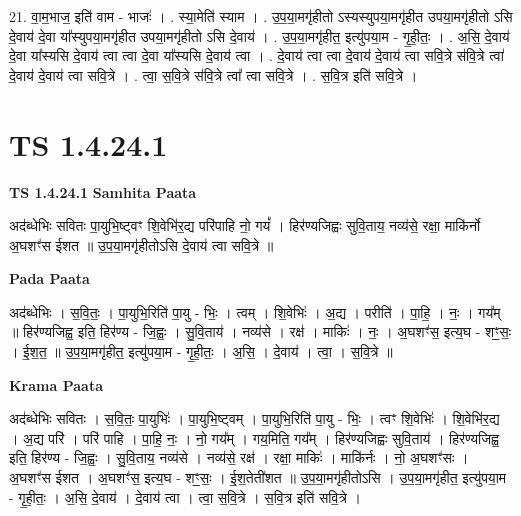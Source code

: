 \documentclass[17pt]{extarticle}
\begin{document}
21. वा॒म॒भाज॒ इति॑ वाम - भाजः॑ । . स्या॒मेति॑ स्याम । . उ॒प॒या॒मगृ॑हीतो ऽस्यस्युपया॒मगृ॑हीत उपया॒मगृ॑हीतो ऽसि दे॒वाय॑ दे॒वा या᳚स्युपया॒मगृ॑हीत उपया॒मगृ॑हीतो ऽसि दे॒वाय॑ । . उ॒प॒या॒मगृ॑हीत॒ इत्यु॑पया॒म - गृ॒ही॒तः॒ । . अ॒सि॒ दे॒वाय॑ दे॒वा या᳚स्यसि दे॒वाय॑ त्वा त्वा दे॒वा या᳚स्यसि दे॒वाय॑ त्वा । . दे॒वाय॑ त्वा त्वा दे॒वाय॑ दे॒वाय॑ त्वा सवि॒त्रे स॑वि॒त्रे त्वा॑ दे॒वाय॑ दे॒वाय॑ त्वा सवि॒त्रे । . त्वा॒ स॒वि॒त्रे स॑वि॒त्रे त्वा᳚ त्वा सवि॒त्रे । . स॒वि॒त्र इति॑ सवि॒त्रे । \newline
\pagebreak
{}

\section{ TS 1.4.24.1 }

\textbf{TS 1.4.24.1 } \newline
\textbf{Samhita Paata} \newline

अद॑ब्धेभिः सवितः पा॒युभि॒ष्ट्वꣳ शि॒वेभि॑र॒द्य परि॑पाहि नो॒ गयं᳚ । हिर॑ण्यजिह्वः सुवि॒ताय॒ नव्य॑से॒ रक्षा॒ माकि॑र्नो अ॒घशꣳ॑स ईशत ॥ उ॒प॒या॒मगृ॑हीतोऽसि दे॒वाय॑ त्वा सवि॒त्रे ॥ \newline

\textbf{Pada Paata} \newline

अद॑ब्धेभिः । स॒वि॒तः॒ । पा॒युभि॒रिति॑ पा॒यु - भिः॒ । त्वम् । शि॒वेभिः॑ । अ॒द्य । परीति॑ । पा॒हि॒ । नः॒ । गय᳚म् ॥ हिर॑ण्यजिह्व॒ इति॒ हिर॑ण्य - जि॒ह्वः॒ । सु॒वि॒ताय॑ । नव्य॑से । रक्ष॑ । माकिः॑ । नः॒ । अ॒घशꣳ॑स॒ इत्य॒घ - शꣳ॒॒सः॒ । ई॒श॒त॒ ॥ उ॒प॒या॒मगृ॑हीत॒ इत्यु॑पया॒म - गृ॒ही॒तः॒ । अ॒सि॒ । दे॒वाय॑ । त्वा॒ । स॒वि॒त्रे ॥  \newline


\textbf{Krama Paata} \newline

अद॑ब्धेभिः सवितः । स॒वि॒तः॒ पा॒युभिः॑ । पा॒युभि॒ष्ट्वम् । पा॒युभि॒रिति॑ पा॒यु - भिः॒ । त्वꣳ शि॒वेभिः॑ । शि॒वेभि॑र॒द्य । अ॒द्य परि॑ । परि॑ पाहि । पा॒हि॒ नः॒ । नो॒ गय᳚म् । गय॒मिति॒ गय᳚म् । हिर॑ण्यजिह्वः सुवि॒ताय॑ । हिर॑ण्यजिह्व॒ इति॒ हिर॑ण्य - जि॒ह्वः॒ । सु॒वि॒ताय॒ नव्य॑से । नव्य॑से॒ रक्ष॑ । रक्षा॒ माकिः॑ । माकि॑र्नः । नो॒ अ॒घशꣳ॑सः । अ॒घशꣳ॑स ईशत । अ॒घशꣳ॑स॒ इत्य॒घ - शꣳ॒॒सः॒ । ई॒श॒तेती॑शत ॥ उ॒प॒या॒मगृ॑हीतोऽसि । उ॒प॒या॒मगृ॑हीत॒ इत्यु॑पया॒म - गृ॒ही॒तः॒ । अ॒सि॒ दे॒वाय॑ । दे॒वाय॑ त्वा । त्वा॒ स॒वि॒त्रे । स॒वि॒त्र इति॑ सवि॒त्रे । \newline
\end{document}
